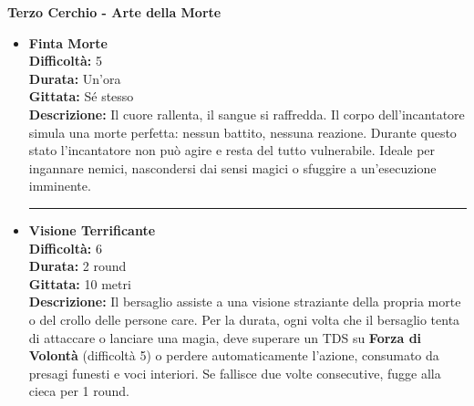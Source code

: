 \documentclass[./magie.tex]{subfiles}
\begin{document}
\clearpage
\vspace{0.2cm}
{\zarafirtitlefont\Large\bfseries Terzo Cerchio - Arte della Morte}

\begin{itemize}

\item \textbf{Finta Morte} \\
\textbf{Difficoltà:} 5 \\
\textbf{Durata:} Un'ora \\
\textbf{Gittata:} Sé stesso \\
\textbf{Descrizione:} Il cuore rallenta, il sangue si raffredda. Il corpo dell'incantatore simula una morte perfetta: nessun battito, nessuna reazione. Durante questo stato l'incantatore non può agire e resta del tutto vulnerabile. Ideale per ingannare nemici, nascondersi dai sensi magici o sfuggire a un'esecuzione imminente.

\vspace{0.5cm}\rule{\textwidth}{0.4pt}\vspace{1cm}

\item \textbf{Visione Terrificante} \\
\textbf{Difficoltà:} 6 \\
\textbf{Durata:} 2 round \\
\textbf{Gittata:} 10 metri \\
\textbf{Descrizione:} Il bersaglio assiste a una visione straziante della propria morte o del crollo delle persone care.  Per la durata, ogni volta che il bersaglio tenta di attaccare o lanciare una magia, deve superare un TDS su \textbf{Forza di Volontà} (difficoltà 5) o perdere automaticamente l'azione, consumato da presagi funesti e voci interiori. Se fallisce due volte consecutive, fugge alla cieca per 1 round.


\end{itemize}
\end{document}
